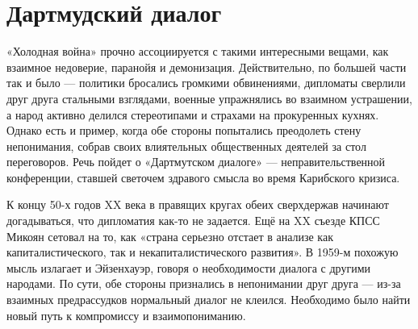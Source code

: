 \chapter{Дартмудский диалог} 

«Холодная война» прочно ассоциируется с такими интересными вещами, как взаимное недоверие, паранойя и демонизация. Действительно, по большей части так и было — политики бросались громкими обвинениями, дипломаты сверлили друг друга стальными взглядами, военные упражнялись во взаимном устрашении, а народ активно делился стереотипами и страхами на прокуренных кухнях. Однако есть и пример, когда обе стороны попытались преодолеть стену непонимания, собрав своих влиятельных общественных деятелей за стол переговоров. Речь пойдет о «Дартмутском диалоге» — неправительственной конференции, ставшей светочем здравого смысла во время Карибского кризиса.

К концу 50-х годов XX века в правящих кругах обеих сверхдержав начинают догадываться, что дипломатия как-то не задается. Ещё на XX съезде КПСС Микоян сетовал на то, как «страна серьезно отстает в анализе как капиталистического, так и некапиталистического развития». В 1959-м похожую мысль излагает и Эйзенхауэр, говоря о необходимости диалога с другими народами. По сути, обе стороны признались в непонимании друг друга — из-за взаимных предрассудков нормальный диалог не клеился. Необходимо было найти новый путь к компромиссу и взаимопониманию.

